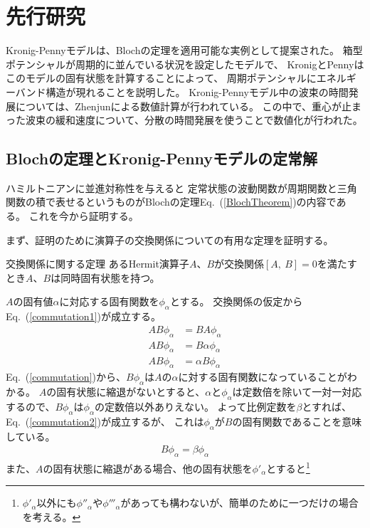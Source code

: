 \documentclass[autodetect-engine,dvipdfmx-if-dvi,ja=standard,a4paper,layout=v2]{bxjsreport}
\newcommand{\eref}[1]{Eq.~(\ref{#1})}
\begin{document}
    \chapter{先行研究}
    \begin{chapterabstract}
    Kronig-Pennyモデルは、Blochの定理を適用可能な実例として提案された。
    箱型ポテンシャルが周期的に並んでいる状況を設定したモデルで、
    KronigとPennyはこのモデルの固有状態を計算することによって、
    周期ポテンシャルにエネルギーバンド構造が現れることを説明した。
    Kronig-Pennyモデル中の波束の時間発展については、Zhenjunによる数値計算が行われている。
    この中で、重心が止まった波束の緩和速度について、分散の時間発展を使うことで数値化が行われた。
    \end{chapterabstract}
    \section{Blochの定理とKronig-Pennyモデルの定常解}
    ハミルトニアンに並進対称性を与えると
    定常状態の波動関数が周期関数と三角関数の積で表せるというものがBlochの定理\eref{BlochTheorem}の内容である。
    これを今から証明する。\par
    まず、証明のために演算子の交換関係についての有用な定理を証明する。
    \begin{itembox}[l]{交換関係に関する定理}
      あるHermit演算子$A$、$B$が交換関係$[A,\:B]=0$を満たすとき$A$、$B$は同時固有状態を持つ。
    \end{itembox}
    $A$の固有値$\alpha$に対応する固有関数を$\phi_\alpha$とする。
    交換関係の仮定から\eref{commutation1}が成立する。
    \begin{align}
      AB\phi_\alpha&=BA\phi_\alpha \nonumber\\
      AB\phi_\alpha&=B\alpha\phi_\alpha \nonumber\\
      AB\phi_\alpha&=\alpha B\phi_\alpha \label{commutationi1}
    \end{align}
    \eref{commutation}から、$B\phi_\alpha$は$A$の$\alpha$に対する固有関数になっていることがわかる。
    $A$の固有状態に縮退がないとすると、$\alpha$と$\phi_\alpha$は定数倍を除いて一対一対応するので、$B\phi_\alpha$は$\phi_\alpha$の定数倍以外ありえない。
    よって比例定数を$\beta$とすれば、\eref{commutation2}が成立するが、
    これは$\phi_\alpha$が$B$の固有関数であることを意味している。
    \begin{align}
      B\phi_\alpha=\beta\phi_\alpha\label{commutation2}
    \end{align}
    また、$A$の固有状態に縮退がある場合、他の固有状態を$\phi'_\alpha$とすると\footnote{
      $\phi'_\alpha$以外にも$\phi''_\alpha$や$\phi'''_\alpha$があっても構わないが、簡単のために一つだけの場合を考える。
    }
\end{document}
